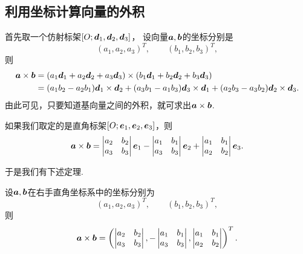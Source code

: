 \subsection{利用坐标计算向量的外积}
首先取一个仿射标架\([O;\boldsymbol{d}_1,\boldsymbol{d}_2,\boldsymbol{d}_3]\)，
设向量\(\boldsymbol{a},\boldsymbol{b}\)的坐标分别是\[
	(a_1,a_2,a_3)^T, \qquad
	(b_1,b_2,b_3)^T,
\]
则\begin{equation}
\begin{split}
	\boldsymbol{a}\times\boldsymbol{b}
	&= (a_1 \boldsymbol{d}_1 + a_2 \boldsymbol{d}_2 + a_3 \boldsymbol{d}_3)
	\times (b_1 \boldsymbol{d}_1 + b_2 \boldsymbol{d}_2 + b_3 \boldsymbol{d}_3) \\
	&= (a_1 b_2 - a_2 b_1) \boldsymbol{d}_1 \times \boldsymbol{d}_2
	+ (a_3 b_1 - a_1 b_3) \boldsymbol{d}_3 \times \boldsymbol{d}_1
	+ (a_2 b_3 - a_3 b_2) \boldsymbol{d}_2 \times \boldsymbol{d}_3.
\end{split}
\end{equation}
由此可见，只要知道基向量之间的外积，就可求出\(\boldsymbol{a}\times\boldsymbol{b}\).

如果我们取定的是直角标架\([O;\boldsymbol{e}_1,\boldsymbol{e}_2,\boldsymbol{e}_3]\)，则
\begin{equation}
	\boldsymbol{a}\times\boldsymbol{b}
	= \begin{vmatrix}
		a_2 & b_2 \\
		a_3 & b_3
	\end{vmatrix}
	\boldsymbol{e}_1
	- \begin{vmatrix}
		a_1 & b_1 \\
		a_3 & b_3
	\end{vmatrix}
	\boldsymbol{e}_2
	+ \begin{vmatrix}
		a_1 & b_1 \\
		a_2 & b_2
	\end{vmatrix}
	\boldsymbol{e}_3.
\end{equation}

于是我们有下述定理.
\begin{theorem}
设\(\boldsymbol{a},\boldsymbol{b}\)在右手直角坐标系中的坐标分别为\[
	(a_1,a_2,a_3)^T, \qquad
	(b_1,b_2,b_3)^T,
\]
则
\begin{equation}
	\boldsymbol{a}\times\boldsymbol{b}
	= \left( \begin{vmatrix}
		a_2 & b_2 \\
		a_3 & b_3
	\end{vmatrix},
	- \begin{vmatrix}
		a_1 & b_1 \\
		a_3 & b_3
	\end{vmatrix},
	\begin{vmatrix}
		a_1 & b_1 \\
		a_2 & b_2
	\end{vmatrix} \right)^T.
\end{equation}
\end{theorem}

